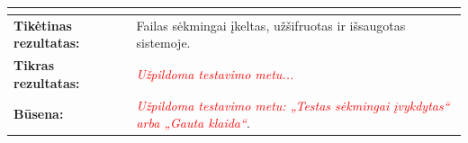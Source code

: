 \documentclass[12pt]{article}
\begin{document}
\begin{table}[htb!]
\begin{tabular}{|m{6cm}|m{11cm}|}
{{        }} \\
        \hline
        \raggedleft \textbf{\cellcolor{deepchampagne}Tikėtinas rezultatas:}
        & Failas sėkmingai įkeltas, užšifruotas ir išsaugotas sistemoje. \\
        \hline
        \raggedleft \textbf{\cellcolor{deepchampagne}Tikras rezultatas:}
        & \textcolor{red}{\emph{Užpildoma testavimo metu...}} \\
        \hline
        \raggedleft \textbf{\cellcolor{deepchampagne}Būsena:}
        & \textcolor{red}{\emph{Užpildoma testavimo metu: „Testas sėkmingai
        įvykdytas“ arba „Gauta klaida“}}. \\
        \hline
    \end{tabular}
    \label{table:TS_2}
\end{table}

\newpage
\end{document}
